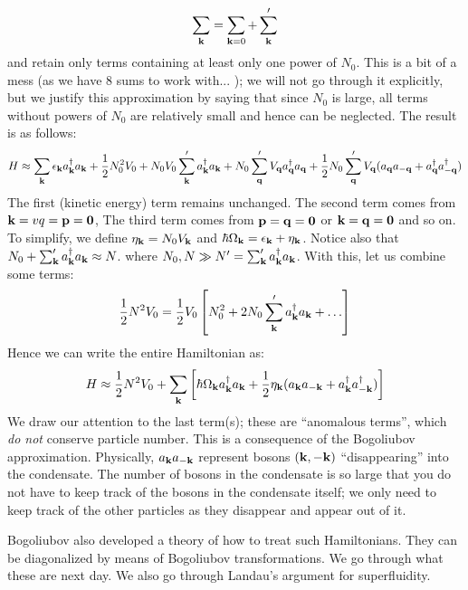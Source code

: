 \begin{align*}
    \sum_{\mathbf{k}} = \sum_{\mathbf{k} = 0} + \sum_{\mathbf{k}}'
\end{align*}
and retain only terms containing at least only one power of $N_0$. This is a bit of a mess (as we have 8 sums to work with... ); we will not go through it explicitly, but we justify this approximation by saying that since $N_0$ is large, all terms without powers of $N_0$ are relatively small and hence can be neglected. The result is as follows:
\begin{equation}
    H \approx \sum_{\mathbf{k}}\epsilon_{\mathbf{k}}a^\dagger_{\mathbf{k}}a_{\mathbf{k}} + \frac{1}{2}N_0^2 V_0 + N_0V_0\sum_{\mathbf{k}}' a_{\mathbf{k}}^\dagger a_{\mathbf{k}} + N_0\sum_{\mathbf{q}}'V_{\mathbf{q}}a^\dagger_{\mathbf{q}}a_{\mathbf{q}} + \frac{1}{2}N_0\sum_{\mathbf{q}}' V_{\mathbf{q}}(a_{\mathbf{q}}a_{-\mathbf{q}} + a_{\mathbf{q}}^\dagger a_{-\mathbf{q}}^\dagger)
\end{equation}
The first (kinetic energy) term remains unchanged. The second term comes from $\mathbf{k} = v{q} = \mathbf{p} = \mathbf{0}$, The third term comes from $\mathbf{p} = \mathbf{q} = \mathbf{0}$ or $\mathbf{k} = \mathbf{q} = \mathbf{0}$ and so on. To simplify, we define $\eta_{\mathbf{k}} = N_0V_{\mathbf{k}}$ and $\hbar \Omega_{\mathbf{k}} = \epsilon_{\mathbf{k}} + \eta_{\mathbf{k}}$. Notice also that $N_0 + \sum_{\mathbf{k}}' a^\dagger_{\mathbf{k}}a_{\mathbf{k}} \approx N$. where $N_0, N \gg N' = \sum_{\mathbf{k}}' a^\dagger_{\mathbf{k}}a_{\mathbf{k}}$. With this, let us combine some terms:
\begin{align*}
    \frac{1}{2}N^2V_0 = \frac{1}{2}V_0\left[N_0^2 + 2N_0\sum_{\mathbf{k}}' a^\dagger_{\mathbf{k}}a_{\mathbf{k}} + \ldots \right]
\end{align*}
Hence we can write the entire Hamiltonian as:
\begin{equation}
    H \approx \frac{1}{2}N^2 V_0 + \sum_{\mathbf{k}}\left[\hbar \Omega_{\mathbf{k}}a^\dagger_{\mathbf{k}}a_{\mathbf{k}} + \frac{1}{2}\eta_{\mathbf{k}}(a_{\mathbf{k}}a_{-\mathbf{k}} + a^\dagger_{\mathbf{k}}a^\dagger_{-\mathbf{k}})\right]
\end{equation}
We draw our attention to the last term(s); these are ``anomalous terms'', which \emph{do not} conserve particle number. This is a consequence of the Bogoliubov approximation. Physically, $a_{\mathbf{k}}a_{-\mathbf{k}}$ represent bosons $(\mathbf{k}, -\mathbf{k})$ ``disappearing'' into the condensate. The number of bosons in the condensate is so large that you do not have to keep track of the bosons in the condensate itself; we only need to keep track of the other particles as they disappear and appear out of it.

Bogoliubov also developed a theory of how to treat such Hamiltonians. They can be diagonalized by means of Bogoliubov transformations. We go through what these are next day. We also go through Landau's argument for superfluidity.
